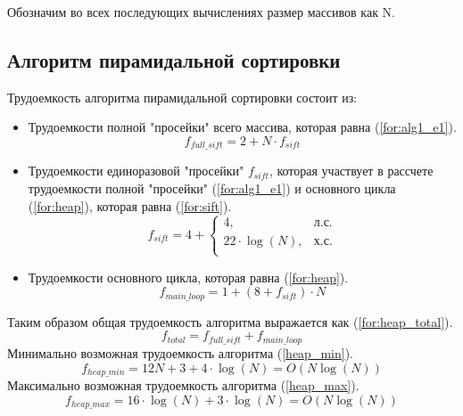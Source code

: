Обозначим во всех последующих вычислениях размер массивов как N.

\subsection{Алгоритм пирамидальной сортировки}

Трудоемкость алгоритма пирамидальной сортировки состоит из:
\begin{itemize}
	\item Трудоемкости полной "просейки" всего массива, которая равна (\ref{for:alg1_e1}).
		\begin{equation}
			\label{for:alg1_e1}
			f_{full\_sift} = 2 + N \cdot f_{sift}
		\end{equation}
	\item Трудоемкости единоразовой "просейки" $f_{sift}$, которая участвует в рассчете трудоемкости полной "просейки" (\ref{for:alg1_e1}) и основного цикла (\ref{for:heap}), которая равна (\ref{for:sift}).
		\begin{equation}
			\label{for:sift}
			f_{sift} = 4 + \begin{cases}
							4, & \text{л.с.}\\
							22 \cdot \log(N), & \text{х.с.}\\
						 \end{cases}
		\end{equation}
	\item Трудоемкости основного цикла, которая равна (\ref{for:heap}).
		\begin{equation}
			\label{for:heap}
			f_{main\_loop} = 1 + (8 + f_{sift}) \cdot N
		\end{equation}
\end{itemize}
Таким образом общая трудоемкость алгоритма выражается как (\ref{for:heap_total}).
\begin{equation}
	\label{for:heap_total}
	f_{total} = f_{full\_sift} + f_{main\_loop}
\end{equation}
Минимально возможная трудоемкость алгоритма (\ref{heap_min}).
\begin{equation}
	\label{heap_min}
	f_{heap\_min} = 12 N + 3 + 4 \cdot \log(N) = O(N\log(N))
\end{equation}
Максимально возможная трудоемкость алгоритма (\ref{heap_max}).
\begin{equation}
	\label{heap_max}
	f_{heap\_max} = 16 \cdot \log(N) + 3 \cdot \log(N) = O(N\log(N))
\end{equation}



